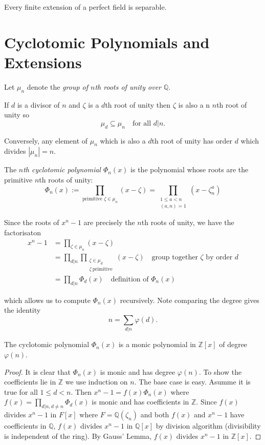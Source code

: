\documentclass[a4paper]{article}
\begin{document}
\begin{corollary}
  Every finite extension of a perfect field is separable.
\end{corollary}

\section{Cyclotomic Polynomials and Extensions} \label{sec:cyclotomic}

\begin{definition}
  Let $\mu_n$ denote the \emph{group of $n$th roots of unity over $\mathbb Q$}.
\end{definition}

If $d$ is a divisor of $n$ and $\zeta$ is a $d$th root of unity then $\zeta$ is also a n $n$th root of unity so
\[ \mu_d \subseteq \mu_n \quad \text{for all } d|n. \]

Conversely, any element of $\mu_n$ which is also a $d$th root of unity has order $d$ which divides $|\mu_n|=n$.

\begin{definition}
  The \emph{$n$th cyclotomic polynomial $\Phi_n(x)$} is the polynomial whose roots are the primitive $n$th roots of unity:
  \[ \Phi_n(x) := \prod_{\text{primitive }\zeta\in \mu_n} (x - \zeta) = \prod_{\substack{1\leq a <n\\ (a,n)=1}} (x-\zeta_n^a) \]
\end{definition}

Since the roots of $x^n-1$ are precisely the $n$th roots of unity, we have the factorisaton
\begin{align*}
  x^n-1 &= \prod_{\zeta \in \mu_n} (x-\zeta)\\
        &= \prod_{d|n} \prod_{\substack{\zeta \in \mu_d\\\zeta\: \text{primitive}}} (x - \zeta) \quad \text{group together $\zeta$ by order $d$}\\
        &= \prod_{d|n} \Phi_d(x) \quad \text{definition of $\Phi_n(x)$}
\end{align*}

which allows us to compute $\Phi_n(x)$ recursively. Note comparing the degree gives the identity
\[ n = \sum_{d|n} \varphi(d). \]

\begin{lemma}
  The cyclotomic polynomial $\Phi_n(x)$ is a monic polynomial in $\mathbb Z[x]$ of degree $\varphi(n)$.
\end{lemma}

\begin{proof}
  It is clear that $\Phi_n(x)$ is monic and has degree $\varphi(n)$. To show the coefficients lie in $\mathbb Z$ we use induction on $n$. The base case is easy. Asumme it is true for all $1 \leq d < n$. Then $x^n-1 = f(x) \Phi_n(x)$ where $f(x) = \prod_{d|n,d\neq n} \Phi_d(x)$ is monic and has coefficients in $\mathbb Z$. Since $f(x)$ divides $x^n - 1$ in $F[x]$ where $F=\mathbb Q(\zeta_n)$ and both $f(x)$ and $x^n - 1$ have coefficients in $\mathbb Q$, $f(x)$ divides $x^n - 1$ in $\mathbb Q[x]$ by division algorithm (divisibility is independent of the ring). By Gauss' Lemma, $f(x)$ divides $x^n -1 $ in $\mathbb Z[x]$.
\end{proof}
\end{document}
